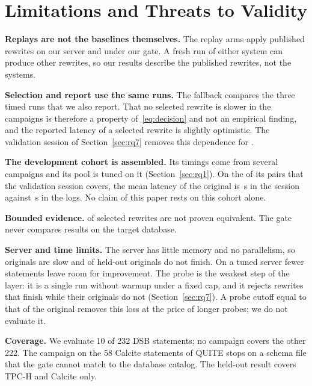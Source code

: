 \documentclass[conference]{IEEEtran}
\newcommand{\secs}[1]{#1\,s}
\begin{document}
\section{Limitations and Threats to Validity}
\label{sec:limits}

\textbf{Replays are not the baselines themselves.}
The replay arms apply published rewrites on our server and under our gate.
A fresh run of either system can produce other rewrites, so our results describe the published rewrites, not the systems.

\textbf{Selection and report use the same runs.}
The fallback compares the three timed runs that we also report.
That no selected rewrite is slower in the campaigns is therefore a property of~\eqref{eq:decision} and not an empirical finding, and the reported latency of a selected rewrite is slightly optimistic.
The validation session of Section~\ref{sec:rq7} removes this dependence for \ValCoverageShort{}.

\textbf{The development cohort is assembled.}
Its timings come from several campaigns and its pool is tuned on it (Section~\ref{sec:rq1}).
On the \ValDevDone{} of its pairs that the validation session covers, the mean latency of the original is \secs{\ValDevOrigMean} in the session against \secs{\ValDevCampaignOrigMean} in the logs.
No claim of this paper rests on this cohort alone.

\textbf{Bounded evidence.}
\AllEvDifferential{} of \AllSelected{} selected rewrites are not proven equivalent.
The gate never compares results on the target database.

\textbf{Server and time limits.}
The server has little memory and no parallelism, so originals are slow and \HeldAllOrigCensored{} of \HeldAllN{} held-out originals do not finish.
On a tuned server fewer statements leave room for improvement.
The probe is the weakest step of the layer: it is a single run without warmup under a fixed cap, and it rejects rewrites that finish while their originals do not (Section~\ref{sec:rq7}).
A probe cutoff equal to that of the original removes this loss at the price of longer probes; we do not evaluate it.

\textbf{Coverage.}
We evaluate 10 of 232 DSB statements; no campaign covers the other 222.
The campaign on the 58 Calcite statements of QUITE stops on a schema file that the gate cannot match to the database catalog.
The held-out result covers TPC-H and Calcite only.
\end{document}
